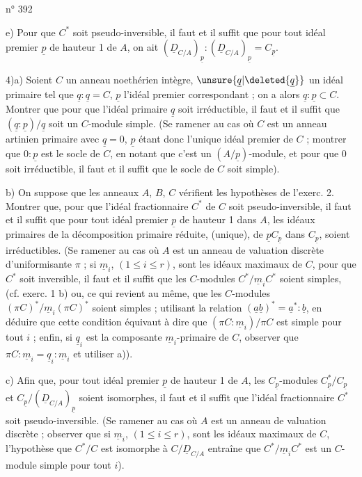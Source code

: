 \hfill n° 392

e) Pour que $C^*$ soit pseudo-inversible, il faut et il suffit que pour tout idéal premier $\underline p$ de hauteur 1 de $A$, on ait $(\underline D_{C/A})_{\underline p}:(\underline D_{C/A})_{\underline p}=C_{\underline p}$.

4)\quad a) Soient $C$ un anneau noethérien intègre, $\unsure{\underline q|\deleted{\underline q}}$ un idéal primaire tel que $\underline q:\underline q=C$, $\underline p$ l'idéal premier correspondant ; on a alors $\underline q:\underline p\subset C$. Montrer que pour que l'idéal primaire $\underline q$ soit irréductible, il faut et il suffit que $(\underline q:\underline p)/\underline q$ soit un $C$-module simple. (Se ramener au cas où $C$ est un anneau artinien primaire avec $\underline q=0$, $\underline p$ étant donc l'unique idéal premier de $C$ ; montrer que $0:\underline p$ est le socle de $C$, en notant que c'est un $(A/\underline p)$-module, et pour que $0$ soit irréductible, il faut et il suffit que le socle de $C$ soit simple).

b) On suppose que les anneaux $A$, $B$, $C$ vérifient les hypothèses de l'exerc. 2. Montrer que, pour que l'idéal fractionnaire $C^*$ de $C$ soit pseudo-inversible, il faut et il suffit que pour tout idéal premier $\underline p$ de hauteur 1 dans $A$, les idéaux primaires de la décomposition primaire réduite, (unique), de $\underline p C_{\underline p}$ dans $C_{\underline p}$, soient irréductibles. (Se ramener au cas où $A$ est un anneau de valuation discrète d'uniformisante $\pi$ ; si $\underline m_i$, $(1\leq i\leq r)$, sont les idéaux maximaux de $C$, pour que $C^*$ soit inversible, il faut et il suffit que les $C$-modules $C^*/\underline m_i C^*$ soient simples, (cf. exerc. 1 b) ou, ce qui revient au même, que les $C$-modules $(\pi C)^*/\underline m_i(\pi C)^*$ soient simples ; utilisant la relation $(\underline a\underline b)^*=\underline a^*:\underline b$, en déduire que cette condition équivaut à dire que $(\pi C:\underline m_i)/\pi C$ est simple pour tout $i$ ; enfin, si $\underline q_i$ est la composante $\underline m_i$-primaire de $C$, observer que $\pi C:\underline m_i=\underline q_i:\underline m_i$ et utiliser a)).

c) Afin que, pour tout idéal premier $\underline p$ de hauteur 1 de $A$, les $C_{\underline p}$-modules $C^*_{\underline p}/C_{\underline p}$ et $C_{\underline p}/(\underline D_{C/A})_{\underline p}$ soient isomorphes, il faut et il suffit que l'idéal fractionnaire $C^*$ soit pseudo-inversible. (Se ramener au cas où $A$ est un anneau de valuation discrète ; observer que si $\underline m_i$, $(1\leq i\leq r)$, sont les idéaux maximaux de $C$, l'hypothèse que $C^*/C$ est isomorphe à $C/\underline D_{C/A}$ entraîne que $C^*/\underline m_i C^*$ est un $C$-module simple pour tout $i$).

